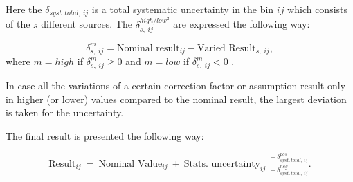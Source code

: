 Here the $\delta_{syst.\,total,\:ij}$ is a total systematic uncertainty in the bin $ij$ which consists of the
$s$ different sources. The $\delta_{s,\;ij}^{high/low^{2}}$ are expressed the following way:

\begin{equation}
 \delta_{s,\;ij}^{m} = \textrm{Nominal result}_{ij} - \textrm{Varied Result}_{s,\;ij}, 
\end{equation}
where $m = high$ if $\delta_{s,\;ij}^{m} \geq 0$ and $m = low$ if $\delta_{s,\;ij}^{m} < 0$ . 

In case all the variations of a certain correction factor or assumption result only in higher (or lower) values 
compared to the nominal result, the largest deviation is taken for the uncertainty.

The final result is presented the following way:

\begin{equation}
 \textrm{Result}_{ij}\: = \: \textrm{Nominal Value}_{ij}\: \pm \: \textrm{Stats. uncertainty}_{ij}\:\: { }^{+\:\delta_{syst.\,total,\:ij}^{pos}}_{-\:\delta_{syst.\,total,\:ij}^{neg}}.
\end{equation}

